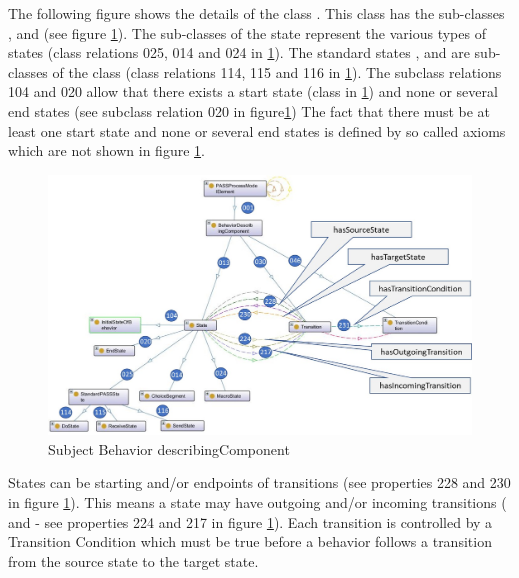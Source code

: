 The following figure shows the details of the class . This class has the sub-classes ,  and  (see figure \ref{fig:20190104-behavior-describing-component}). The sub-classes of the state represent the various types of states (class relations 025, 014 and 024 in \ref{fig:20190104-behavior-describing-component}). The standard states ,  and  are sub-classes of the class  (class relations 114, 115 and 116 in \ref{fig:20190104-behavior-describing-component}). The subclass relations 104 and 020 allow that there exists a start state (class  in \ref{fig:20190104-behavior-describing-component}) and none or several end states (see subclass relation 020 in figure\ref{fig:20190104-behavior-describing-component}) The fact that there must be at least one start state and none or several end states is defined by so called axioms which are not shown in figure \ref{fig:20190104-behavior-describing-component}.

\begin{figure}[htbp]
	\centering
	\includegraphics[width=1.0\linewidth]{Figures/Ontology/SubjectBehavior/20190104-Behavior-describing-component}
	\caption[Subject Behavior describing Component]{Subject Behavior describingComponent}
	\label{fig:20190104-behavior-describing-component}
\end{figure}

States can be starting and/or endpoints of transitions (see properties 228 and 230 in figure \ref{fig:20190104-behavior-describing-component}). This means a state may have outgoing and/or incoming transitions (  and  - see properties 224 and 217 in figure \ref{fig:20190104-behavior-describing-component}). Each transition is controlled by a Transition Condition which must be true before a behavior follows a transition from the source state to the target state.

